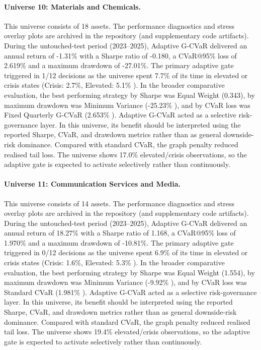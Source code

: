\documentclass[11pt]{article}
\begin{document}
\paragraph{Universe 10: Materials and Chemicals.}
This universe consists of 18 assets. The performance diagnostics and stress overlay plots are archived in the repository (and supplementary code artifacts). During the untouched-test period (2023--2025), Adaptive G-CVaR delivered an annual return of -1.31\% with a Sharpe ratio of -0.180, a CVaR@95\% loss of 2.619\% and a maximum drawdown of -27.01\%. The primary adaptive gate triggered in 1/12 decisions as the universe spent 7.7\% of its time in elevated or crisis states (Crisis: 2.7\%, Elevated: 5.1\% ). In the broader comparative evaluation, the best performing strategy by Sharpe was Equal Weight (0.343), by maximum drawdown was Minimum Variance (-25.23\% ), and by CVaR loss was Fixed Quarterly G-CVaR (2.653\% ). Adaptive G-CVaR acted as a selective risk-governance layer. In this universe, its benefit should be interpreted using the reported Sharpe, CVaR, and drawdown metrics rather than as general downside-risk dominance. Compared with standard CVaR, the graph penalty reduced realised tail loss. The universe shows 17.0\% elevated/crisis observations, so the adaptive gate is expected to activate selectively rather than continuously.

\paragraph{Universe 11: Communication Services and Media.}
This universe consists of 14 assets. The performance diagnostics and stress overlay plots are archived in the repository (and supplementary code artifacts). During the untouched-test period (2023--2025), Adaptive G-CVaR delivered an annual return of 18.27\% with a Sharpe ratio of 1.168, a CVaR@95\% loss of 1.970\% and a maximum drawdown of -10.81\%. The primary adaptive gate triggered in 0/12 decisions as the universe spent 6.9\% of its time in elevated or crisis states (Crisis: 1.6\%, Elevated: 5.3\% ). In the broader comparative evaluation, the best performing strategy by Sharpe was Equal Weight (1.554), by maximum drawdown was Minimum Variance (-9.92\% ), and by CVaR loss was Standard CVaR (1.981\% ). Adaptive G-CVaR acted as a selective risk-governance layer. In this universe, its benefit should be interpreted using the reported Sharpe, CVaR, and drawdown metrics rather than as general downside-risk dominance. Compared with standard CVaR, the graph penalty reduced realised tail loss. The universe shows 19.4\% elevated/crisis observations, so the adaptive gate is expected to activate selectively rather than continuously.
\end{document}
